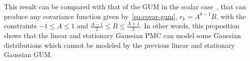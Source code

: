 This result can be compared with that of the GUM in the scalar 
case~\citep{salaun2019comparing}, 
that can produce any covariance function  given by~\eqref{eq:covar-gum},
$r_{k}=A^{k-1} B$,   with the constraints     $-1  \leq A  \leq 1 $ and 
$\frac{A-1}{2} \leq  B \leq \frac{A+1}{2}$.
In other words, this proposition shows that the linear and stationary Gaussian PMC
can model some Gaussian distributions which cannot be modeled by 
the previous linear and stationary Gaussian GUM.





  
